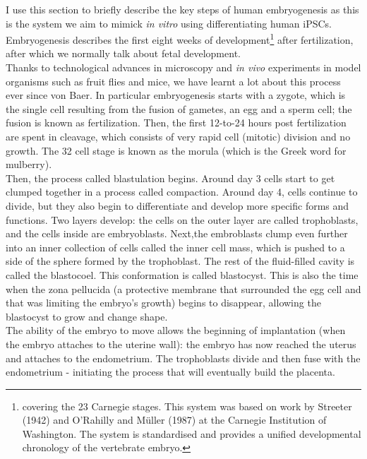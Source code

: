 I use this section to briefly describe the key steps of human embryogenesis as this is the system we aim to mimick \textit{in vitro} using differentiating human iPSCs.
Embryogenesis describes the first eight weeks of development\footnote{covering the 23 Carnegie stages.
This system was based on work by Streeter (1942) and O'Rahilly and Müller (1987) at the Carnegie Institution of Washington.
The system is standardised and provides a unified developmental chronology of the vertebrate embryo.} after fertilization, after which we normally talk about fetal development.\\

Thanks to technological advances in microscopy and \textit{in vivo} experiments in model organisms such as fruit flies and mice, we have learnt a lot about this process ever since von Baer.
In particular embryogenesis starts with a zygote, which is the single cell resulting from the fusion of gametes, an egg and a sperm cell; the fusion is known as fertilization.
Then, the first 12-to-24 hours post fertilization are spent in cleavage, which consists of very rapid cell (mitotic) division and no growth.
The 32 cell stage is known as the morula (which is the Greek word for mulberry).\\

Then, the process called blastulation begins.
Around day 3 cells start to get clumped together in a process called compaction.
Around day 4, cells continue to divide, but they also begin to differentiate and develop more specific forms and functions.
Two layers develop: the cells on the outer layer are called trophoblasts, and the cells inside are embryoblasts. 
Next,the embroblasts clump even further into an inner collection of cells called the inner cell mass, which is pushed to a side of the sphere formed by the trophoblast.
The rest of the fluid-filled cavity is called the blastocoel.
This conformation is called blastocyst.
This is also the time when the zona pellucida (a protective membrane that surrounded the egg cell and that was limiting the embryo's growth) begins to disappear, allowing the blastocyst to grow and change shape.\\

The ability of the embryo to move allows the beginning of implantation (when the embryo attaches to the uterine wall): the embryo has now reached the uterus and attaches to the endometrium.
The trophoblasts divide and then fuse with the endometrium -
initiating the process that
will eventually build the placenta.\\

